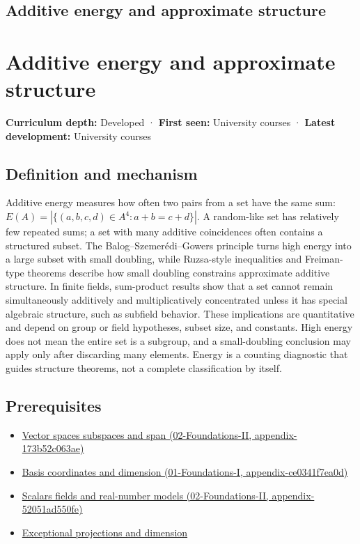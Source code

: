 \hypertarget{appendix-b0732b22e7d6}{}
\section*{Additive energy and approximate structure}
\chapter{Additive energy and approximate structure}\label{appendix-b0732b22e7d6-additive-energy-and-approximate-structure}

\textbf{Curriculum depth:} Developed · \textbf{First seen:} University courses · \textbf{Latest development:} University courses

\section{Definition and mechanism}\label{appendix-b0732b22e7d6-definition-and-mechanism}

Additive energy measures how often two pairs from a set have the same sum: \(E(A)=|\{(a,b,c,d)\in A^4:a+b=c+d\}|\). A random-like set has relatively few repeated sums; a set with many additive coincidences often contains a structured subset. The Balog--Szemerédi--Gowers principle turns high energy into a large subset with small doubling, while Ruzsa-style inequalities and Freiman-type theorems describe how small doubling constrains approximate additive structure. In finite fields, sum-product results show that a set cannot remain simultaneously additively and multiplicatively concentrated unless it has special algebraic structure, such as subfield behavior. These implications are quantitative and depend on group or field hypotheses, subset size, and constants. High energy does not mean the entire set is a subgroup, and a small-doubling conclusion may apply only after discarding many elements. Energy is a counting diagnostic that guides structure theorems, not a complete classification by itself.

\section{Prerequisites}\label{appendix-b0732b22e7d6-prerequisites}

\begin{itemize}
\tightlist
\item
  \href{../02-Foundations-II/main.pdf\#nameddest=appendix-173b52c063ae}{Vector spaces subspaces and span (02-Foundations-II, appendix-173b52c063ae)}
\item
  \href{../01-Foundations-I/main.pdf\#nameddest=appendix-ce0341f7ea0d}{Basis coordinates and dimension (01-Foundations-I, appendix-ce0341f7ea0d)}
\item
  \href{../02-Foundations-II/main.pdf\#nameddest=appendix-52051ad550fe}{Scalars fields and real-number models (02-Foundations-II, appendix-52051ad550fe)}
\item
  \hyperref[appendix-3c73f7862157]{Exceptional projections and dimension}
\end{itemize}

